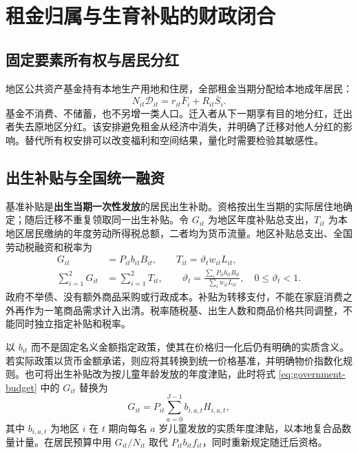 \documentclass[UTF8,a4paper,zihao=-4,fontset=windows]{ctexart}
\numberwithin{equation}{section}
\begin{document}
\section{租金归属与生育补贴的财政闭合}
\label{sec:fiscal}

\subsection{固定要素所有权与居民分红}
地区公共资产基金持有本地生产用地和住房，全部租金当期分配给本地成年居民：
\begin{equation}
  N_{it}\mathcal D_{it}=r_{it}\bar F_i+R_{it}\bar S_i.
  \label{eq:rent-rebate}
\end{equation}
基金不消费、不储蓄，也不另增一类人口。迁入者从下一期享有目的地分红，迁出者失去原地区分红。该安排避免租金从经济中消失，并明确了迁移对他人分红的影响。替代所有权安排可以改变福利和空间结果，量化时需要检验其敏感性。

\subsection{出生补贴与全国统一融资}
基准补贴是\textbf{出生当期一次性发放}的居民出生补助。资格按出生当期的实际居住地确定；随后迁移不重复领取同一出生补贴。令 $G_{it}$ 为地区年度补贴总支出，$T_{it}$ 为本地区居民缴纳的年度劳动所得税总额，二者均为货币流量。地区补贴总支出、全国劳动税融资和税率为
\begin{align}
  G_{it}&=P_{it}b_{it}B_{it},\qquad
  T_{it}=\vartheta_tw_{it}L_{it},\\
  \sum_{i=1}^2G_{it}&=\sum_{i=1}^2T_{it},\qquad
  \vartheta_t=
    \frac{\sum_iP_{it}b_{it}B_{it}}{\sum_iw_{it}L_{it}},
  \quad 0\leq\vartheta_t<1.
  \label{eq:government-budget}
\end{align}
政府不举债、没有额外商品采购或行政成本。补贴为转移支付，不能在家庭消费之外再作为一笔商品需求计入出清。税率随税基、出生人数和商品价格共同调整，不能同时独立指定补贴和税率。

以 $b_{it}$ 而不是固定名义金额指定政策，使其在价格归一化后仍有明确的实质含义。若实际政策以货币金额承诺，则应将其转换到统一价格基准，并明确物价指数化规则。也可将出生补贴改为按儿童年龄发放的年度津贴，此时将式 \eqref{eq:government-budget} 中的 $G_{it}$ 替换为
\begin{equation}
  G_{it}=P_{it}\sum_{a=0}^{J-1}b_{i,a,t}H_{i,a,t},
  \label{eq:child-allowance}
\end{equation}
其中 $b_{i,a,t}$ 为地区 $i$ 在 $t$ 期向每名 $a$ 岁儿童发放的实质年度津贴，以本地复合品数量计量。在居民预算中用 $G_{it}/N_{it}$ 取代 $P_{it}b_{it}f_{it}$，同时重新规定随迁后资格。
\end{document}
